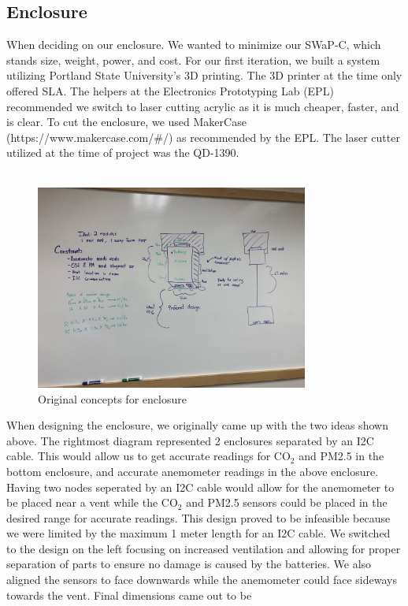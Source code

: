 \subsection{Enclosure}
When deciding on our enclosure. We wanted to minimize our SWaP-C, which stands size, weight, power, and cost. For our first iteration, we built a system utilizing Portland State University’s 3D printing. The 3D printer at the time only offered SLA. The helpers at the Electronics Prototyping Lab (EPL) recommended we switch to laser cutting acrylic as it is much cheaper, faster, and is clear. To cut the enclosure, we used MakerCase (https://www.makercase.com/\#/) as recommended by the EPL. The laser cutter utilized at the time of project was the QD-1390. \\
\\
\begin{figure}[H]
    \centering
    \includegraphics[width=0.8\textwidth]{Pictures/image (2).png}
    \caption[Original concepts for enclosure]{Original concepts for enclosure} 
    \label{fig:part1commrin}
\end{figure}
When designing the enclosure, we originally came up with the two ideas shown above. The rightmost diagram represented 2 enclosures separated by an I2C cable. This would allow us to get accurate readings for CO$_2$ and PM2.5 in the bottom enclosure, and accurate anemometer readings in the above enclosure. Having two nodes seperated by an I2C cable would allow for the anemometer to be placed near a vent while the CO$_2$ and PM2.5 sensors could be placed in the desired range for accurate readings. This design proved to be infeasible because we were limited by the maximum 1 meter length for an I2C cable. We switched to the design on the left focusing on increased ventilation and allowing for proper separation of parts to ensure no damage is caused by the batteries. We also aligned the sensors to face downwards while the anemometer could face sideways towards the vent. Final dimensions came out to be 
